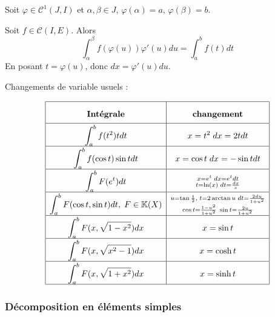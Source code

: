 Soit $\varphi \in \mathscr C^1(J, I)$ et $\alpha, \beta \in J$, 
$\varphi(\alpha) = a, \, \varphi(\beta) = b$.

Soit $f \in \mathscr C(I, E)$. Alors $$\int_\alpha^\beta f(\varphi(u)) \varphi'(u) du = \int_a^b f(t) dt$$
En posant $t = \varphi(u)$, donc $dx = \varphi'(u) du$.

Changements de variable usuels : 

$$\renewcommand{\arraystretch}{2.1}
{\everymath{\displaystyle}
\begin{array}{|c|c|}
    \hline 
    \text{\textbf{Intégrale}} & \text{\textbf{changement}} \\
    \hline
    \displaystyle \int_a^b f(t^2)t dt & x = t^2 \; dx = 2t dt \\
    \hline
    \int_a^b f(\cos t) \sin t dt & x = \cos t \; dx = -\sin t dt \\
    \hline
    \int_a^b F(e^t) dt & \substack{x = e^t \; dx = e^t dt \\ t = \ln(x) \; dt = \frac{dx} x} \\
    \hline 
    \int_{a }^{b } F(\cos t, \sin t) dt, \; F \in \K(X) & \substack{u = \tan \frac t 2, \; t = 2 \arctan u \; dt = \frac{2 du}{1 + u^2} \\ \cos t = \frac{1 - u^2}{1 + u^2} \; \sin t = \frac{2u}{1 + u^2}} \\
    \hline
    \int_{a }^{b } F(x, \sqrt{1 - x^2}) dx & x = \sin t \\
    \hline
    \int_{a }^{b } F(x, \sqrt{x^2 - 1}) dx & x = \cosh t \\
    \hline
    \int_{a }^{b } F(x, \sqrt{1 + x^2}) dx & x = \sinh t \\
    \hline
\end{array}}$$

\subsubsection{Décomposition en éléments simples }

